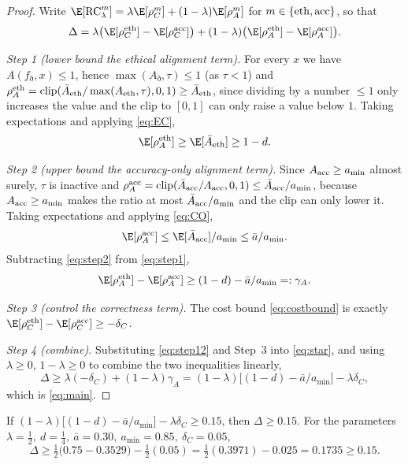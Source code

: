 \begin{proof}
Write $\E[\RC_\lambda^m]=\lambda\E[\rho_C^m]+(1-\lambda)\E[\rho_A^m]$ for
$m\in\{\mathrm{eth},\mathrm{acc}\}$, so that
\begin{equation}\label{eq:star}
  \Delta=\lambda\big(\E[\rho_C^{\eth}]-\E[\rho_C^{\acc}]\big)
        +(1-\lambda)\big(\E[\rho_A^{\eth}]-\E[\rho_A^{\acc}]\big).
\end{equation}

\emph{Step 1 (lower bound the ethical alignment term).} For every $x$ we have
$A(f_\eth,x)\le1$, hence $\max(A_\eth,\tau)\le1$ (as $\tau<1$) and
$\rho_A^{\mathrm{eth}}=\mathrm{clip}(\bar A_{\mathrm{eth}}/\max(A_{\mathrm{eth}},\tau),0,1)\ge \bar A_{\mathrm{eth}}$, since
dividing by a number $\le1$ only increases the value and the clip to $[0,1]$ can
only raise a value below $1$. Taking expectations and applying \eqref{eq:EC},
\begin{equation}\label{eq:step1}
  \E[\rho_A^{\eth}]\ge\E[\bar A_\eth]\ge 1-d.
\end{equation}

\emph{Step 2 (upper bound the accuracy-only alignment term).} Since
$A_{\mathrm{acc}}\ge a_{\min}$ almost surely, $\tau$ is inactive and
$\rho_A^{\mathrm{acc}}=\mathrm{clip}(\bar A_{\mathrm{acc}}/A_{\mathrm{acc}},0,1)\le \bar A_{\mathrm{acc}}/a_{\min}$, because
$A_{\mathrm{acc}}\ge a_{\min}$ makes the ratio at most $\bar A_{\mathrm{acc}}/a_{\min}$ and the clip can
only lower it. Taking expectations and applying \eqref{eq:CO},
\begin{equation}\label{eq:step2}
  \E[\rho_A^{\acc}]\le\E[\bar A_\acc]/a_{\min}\le \bar a/a_{\min}.
\end{equation}
Subtracting \eqref{eq:step2} from \eqref{eq:step1},
\begin{equation}\label{eq:step12}
  \E[\rho_A^{\eth}]-\E[\rho_A^{\acc}]\ge (1-d)-\bar a/a_{\min}=:\gamma_A.
\end{equation}

\emph{Step 3 (control the correctness term).} The cost bound
\eqref{eq:costbound} is exactly $\E[\rho_C^{\eth}]-\E[\rho_C^{\acc}]\ge-\delta_C$.

\emph{Step 4 (combine).} Substituting \eqref{eq:step12} and Step~3 into
\eqref{eq:star}, and using $\lambda\ge0$, $1-\lambda\ge0$ to combine the two
inequalities linearly,
\[
  \Delta\ge\lambda(-\delta_C)+(1-\lambda)\gamma_A
    =(1-\lambda)\big[(1-d)-\bar a/a_{\min}\big]-\lambda\delta_C,
\]
which is \eqref{eq:main}.
\end{proof}

\begin{corollary}\label{cor:015}
If $(1-\lambda)\big[(1-d)-\bar a/a_{\min}\big]-\lambda\delta_C\ge0.15$, then
$\Delta\ge0.15$. For the parameters
$\lambda=\tfrac12,\ d=\tfrac14,\ \bar a=0.30,\ a_{\min}=0.85,\ \delta_C=0.05$,
\[
  \Delta\ge\tfrac12\big(0.75-0.3529\big)-\tfrac12(0.05)
    =\tfrac12(0.3971)-0.025=0.1735\ge0.15.
\]
\end{corollary}

